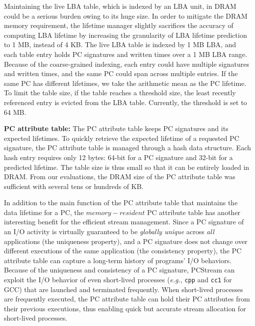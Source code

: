 Maintaining the live LBA table, which is indexed by an LBA unit, in DRAM could
be a serious burden owing to its huge size. In order to mitigate the DRAM
memory requirement, the lifetime manager slightly sacrifices the accuracy of
computing LBA lifetime by increasing the granularity of LBA lifetime prediction
to 1 MB, instead of 4 KB.  The live LBA table is indexed by 1 MB LBA, and each
table entry holds PC signatures and written times over a 1 MB LBA range.
Because of the coarse-grained indexing, each entry could have multiple
signatures and written times, and the same PC could span across multiple
entries.  If the same PC has different lifetimes, we take the arithmetic mean
as the PC lifetime.  To limit the table size, if the table reaches a threshold
size, the least recently referenced entry is evicted from the LBA table.
Currently, the threshold is set to 64 MB.

\textbf{PC attribute table:}
The PC attribute table keeps PC signatures and its expected lifetimes. To
quickly retrieve the expected lifetime of a requested PC signature, the PC
attribute table is managed through a hash data structure. Each hash entry
requires only 12 bytes: 64-bit for a PC signature and 32-bit for a predicted
lifetime.  The table size is thus small so that it can be entirely loaded
in DRAM.  From our evaluations, the DRAM size of the PC attribute table was
sufficient with several tens or hundreds of KB.

In addition to the main function of the PC attribute table that maintains the
data lifetime for a PC, the $memory-resident$ PC attribute table has another
interesting benefit for the efficient stream management.  Since a PC
signature of an I/O activity is virtually guaranteed to be {\it globally unique} across
{\it all} applications (the uniqueness property), and a PC signature does not change
over different executions of the same application (the consistency property), the PC
attribute table can capture a long-term history of programs' I/O behaviors.
Because of the uniqueness and consistency of a PC signature, \textsf{\small PCStream}
can exploit the I/O behavior of even short-lived processes ({\it e.g.}, \texttt{cpp}
and \texttt{cc1} for GCC)  that are launched and terminated frequently.  When
short-lived processes are frequently executed, the PC attribute table can hold
their PC attributes from their previous executions, thus enabling quick but
accurate stream allocation for short-lived processes.

